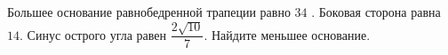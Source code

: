 \begin{ex}
	\begin{condition}
		Большее основание равнобедренной трапеции равно \( 34 \) . Боковая сторона равна \( 14 \). Синус острого угла равен  \( \dfrac{2\sqrt{10}}{7} \).  Найдите меньшее основание.
	\end{condition}
\end{ex}